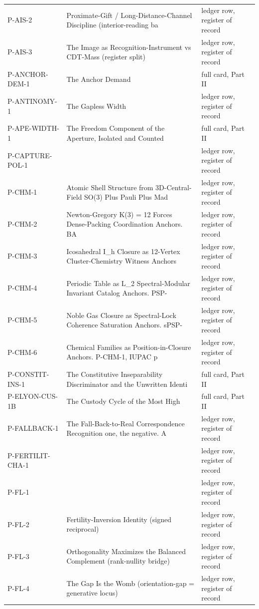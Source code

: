 \documentclass[10pt,twocolumn]{article}
\begin{document}
\begin{center}
\begin{longtable}{>{\raggedright\arraybackslash}p{}>{\raggedright\arraybackslash}p{}>{\raggedright\arraybackslash}p{}}
P-AIS-2 & Proximate-Gift / Long-Distance-Channel Discipline (interior-reading ba & ledger row, register of record \\
P-AIS-3 & The Image as Recognition-Instrument vs CDT-Mass (register split) & ledger row, register of record \\
P-ANCHOR-DEM-1 & The Anchor Demand & full card, Part II \\
P-ANTINOMY-1 & The Gapless Width & ledger row, register of record \\
P-APE-WIDTH-1 & The Freedom Component of the Aperture, Isolated and Counted & full card, Part II \\
P-CAPTURE-POL-1 &  & ledger row, register of record \\
P-CHM-1 & Atomic Shell Structure from 3D-Central-Field SO(3) Plus Pauli Plus Mad & ledger row, register of record \\
P-CHM-2 & Newton-Gregory K(3) = 12 Forces Dense-Packing Coordination Anchors. BA & ledger row, register of record \\
P-CHM-3 & Icosahedral I\_h Closure as 12-Vertex Cluster-Chemistry Witness Anchors & ledger row, register of record \\
P-CHM-4 & Periodic Table as L\_2 Spectral-Modular Invariant Catalog Anchors. PSP- & ledger row, register of record \\
P-CHM-5 & Noble Gas Closure as Spectral-Lock Coherence Saturation Anchors. sPSP- & ledger row, register of record \\
P-CHM-6 & Chemical Families as Position-in-Closure Anchors. P-CHM-1, IUPAC p & ledger row, register of record \\
P-CONSTIT-INS-1 & The Constitutive Inseparability Discriminator and the Unwritten Identi & full card, Part II \\
P-ELYON-CUS-1B & The Custody Cycle of the Most High & full card, Part II \\
P-FALLBACK-1 & The Fall-Back-to-Real Correspondence Recognition one, the negative. A & ledger row, register of record \\
P-FERTILIT-CHA-1 &  & ledger row, register of record \\
P-FL-1 &  & ledger row, register of record \\
P-FL-2 & Fertility-Inversion Identity (signed reciprocal) & ledger row, register of record \\
P-FL-3 & Orthogonality Maximizes the Balanced Complement (rank-nullity bridge) & ledger row, register of record \\
P-FL-4 & The Gap Is the Womb (orientation-gap = generative locus) & ledger row, register of record \\

\end{longtable}
\end{center}
\end{document}
